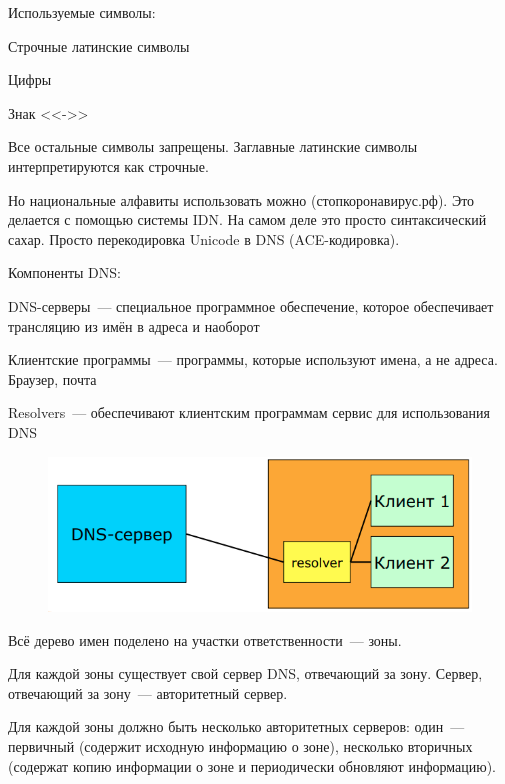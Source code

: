 
Используемые символы:
\begin{MyItemize}
    \item Строчные латинские символы
    \item Цифры
    \item Знак <<->>
\end{MyItemize}

Все остальные символы запрещены. Заглавные латинские символы интерпретируются как строчные.

Но национальные алфавиты использовать можно (стопкоронавирус.рф). Это делается с помощью системы IDN. На самом деле это просто синтаксический сахар. Просто перекодировка Unicode в DNS (ACE-кодировка).


Компоненты DNS:
\begin{MyItemize}
    \item DNS-серверы~--- специальное программное обеспечение, которое обеспечивает трансляцию из имён в адреса и наоборот
    \item Клиентские программы~--- программы, которые используют имена, а не адреса. Браузер, почта
    \item Resolvers~--- обеспечивают клиентским программам сервис для использования DNS
\end{MyItemize}

\begin{figure}[H]
  \centering
  \includegraphics[width=15cm]{images/05/02}
\end{figure}


Всё дерево имен поделено на участки ответственности~--- зоны.

Для каждой зоны существует свой сервер DNS, отвечающий за зону. Сервер, отвечающий за зону~--- авторитетный сервер.

Для каждой зоны должно быть несколько авторитетных серверов: один~--- первичный (содержит исходную информацию о зоне), несколько вторичных (содержат копию информации о зоне и периодически обновляют информацию).

